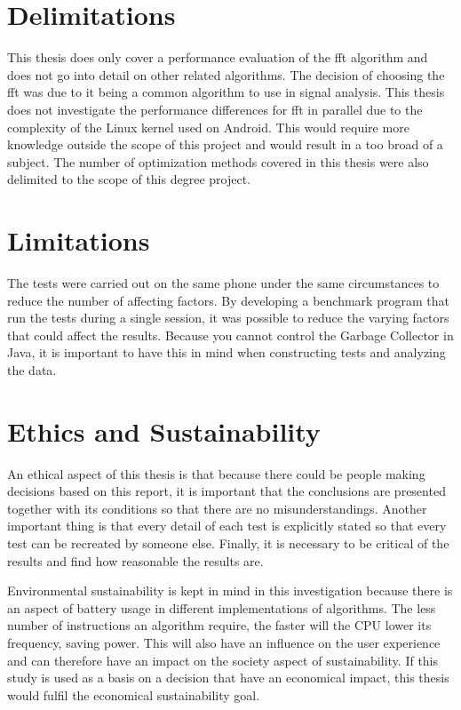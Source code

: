 \section{Delimitations}
This thesis does only cover a performance evaluation of the \gls{fft} algorithm and does not go into detail on other related algorithms. The decision of choosing the \gls{fft} was due to it being a common algorithm to use in signal analysis. This thesis does not investigate the performance differences for \gls{fft} in parallel due to the complexity of the Linux kernel used on Android. This would require more knowledge outside the scope of this project and would result in a too broad of a subject. The number of optimization methods covered in this thesis were also delimited to the scope of this degree project.

\section{Limitations}
The tests were carried out on the same phone under the same circumstances to reduce the number of affecting factors. By developing a benchmark program that run the tests during a single session, it was possible to reduce the varying factors that could affect the results. Because you cannot control the Garbage Collector in Java, it is important to have this in mind when constructing tests and analyzing the data.

\section{Ethics and Sustainability}
An ethical aspect of this thesis is that because there could be people making decisions based on this report, it is important that the conclusions are presented together with its conditions so that there are no misunderstandings. Another important thing is that every detail of each test is explicitly stated so that every test can be recreated by someone else. Finally, it is necessary to be critical of the results and find how reasonable the results are.

Environmental sustainability is kept in mind in this investigation because there is an aspect of battery usage in different implementations of algorithms. The less number of instructions an algorithm require, the faster will the CPU lower its frequency, saving power. This will also have an influence on the user experience and can therefore have an impact on the society aspect of sustainability. If this study is used as a basis on a decision that have an economical impact, this thesis would fulfil the economical sustainability goal.

